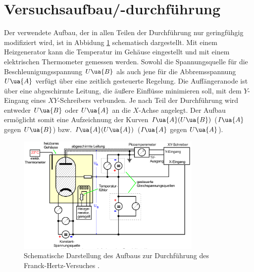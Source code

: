 \section{Versuchsaufbau/-durchführung}
Der verwendete Aufbau, der in allen Teilen der Durchführung nur geringfühgig modifiziert wird, ist in
Abbidung \ref{fig: aufbau} schematisch dargestellt. Mit einem Heizgenerator kann die Temperatur im Gehäuse
eingestellt und mit einem elektrischen Thermometer gemessen werden. Sowohl die Spannungsquelle für die
Beschleunigungsspannung $U\ua{B}$ als auch jene für die Abbremsspannung $U\ua{A}$ verfügt über
eine zeitlich gesteuerte Regelung. Die Auffängeranode ist über eine abgeschirmte Leitung, die
äußere Einflüsse minimieren soll, mit dem $Y$-Eingang eines $XY$-Schreibers verbunden. Je nach Teil der
Durchführung wird entweder $U\ua{B}$ oder $U\ua{A}$ an die $X$-Achse angelegt. Der Aufbau ermöglicht somit
eine Aufzeichnung der Kurven $I\ua{A}(U\ua{B})$ ($I\ua{A}$ gegen $U\ua{B}$) bzw. $I\ua{A}(U\ua{A})$ ($I\ua{A}$ gegen $U\ua{A}$).
\begin{figure}[H]
  \centering
  \includegraphics[width = 0.8\textwidth]{pics/aufbau.png}
  \caption{Schematische Darstellung des Aufbaus zur Durchführung des Franck-Hertz-Versuches \cite{anleitung601}.}
  \label{fig: aufbau}
\end{figure}

